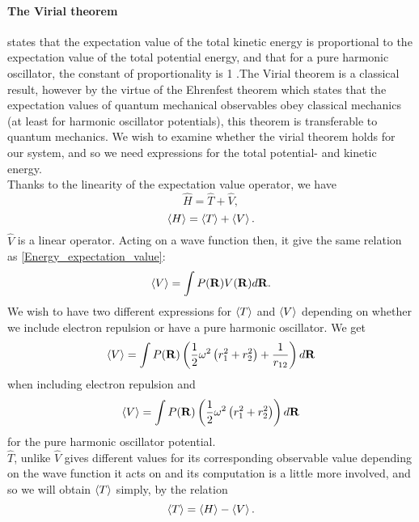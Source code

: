 \documentclass[10pt,a4paper]{article}
\begin{document}
\paragraph{The Virial theorem}states that the expectation value of the total kinetic energy is proportional to the expectation value of the total potential energy, and that for a pure harmonic oscillator, the constant of proportionality is 1 \cite{Problem_set_5}.The Virial theorem is a classical result, however by the virtue of the Ehrenfest theorem which states that the expectation values of quantum mechanical observables obey classical mechanics (at least for harmonic oscillator potentials)\cite{griffiths2018introduction}, this theorem is transferable to quantum mechanics. We wish to examine whether the virial theorem holds for our system, and so we need expressions for the total potential- and kinetic energy.\\Thanks to the linearity of the expectation value operator, we have 
\begin{equation}
\hat{H}=\hat{T}+\hat{V},
\end{equation}
\begin{equation}
\braket{H} = \braket{T} + \braket{V}.
\end{equation}
$\hat{V}$ is a linear operator. Acting on a wave function then, it give the same relation as \eqref{Energy_expectation_value}:
\begin{equation}
\braket{V} = \int P({\bf R})V({\bf R})d{\bf R}.
\end{equation}
We wish to have two different expressions for $\braket{T}$ and $\braket{V}$ depending on whether we include electron repulsion or have a pure harmonic oscillator. We get
\begin{equation}
\braket{V} = \int P({\bf R})\left( \frac{1}{2} \omega^2   \left( r_1^2+r_2^2 \right) +\frac{1}{r_{12}} \right)d{\bf R}
\end{equation}
when including electron repulsion and 
\begin{equation}
\braket{V} = \int P({\bf R})\left( \frac{1}{2} \omega^2   \left( r_1^2+r_2^2 \right) \right)d{\bf R}
\end{equation}
for the pure harmonic oscillator potential.\\$\hat{T}$, unlike $\hat{V}$ gives different values for its corresponding observable value depending on the wave function it acts on and its computation is a little more involved, and so we will obtain $\braket{T}$ simply, by the relation
\begin{equation}
\braket{T} = \braket{H}-\braket{V}.
\end{equation}
\end{document}
